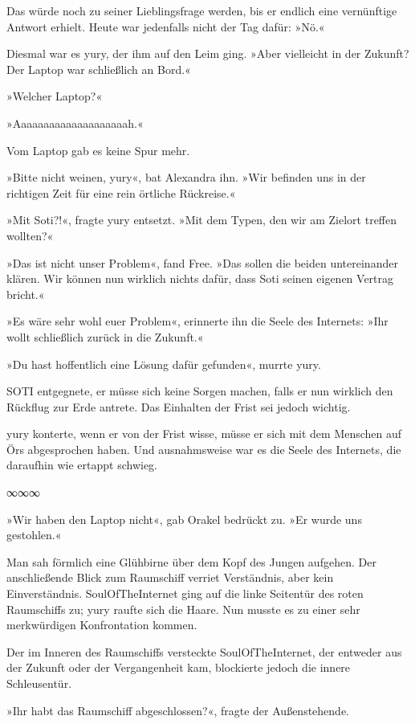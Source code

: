 Das würde noch zu seiner Lieblingsfrage werden, bis er endlich eine vernünftige Antwort erhielt. Heute war jedenfalls nicht der Tag dafür: »Nö.«

Diesmal war es yury, der ihm auf den Leim ging. »Aber vielleicht in der Zukunft? Der Laptop war schließlich an Bord.«

»Welcher Laptop?«

»Aaaaaaaaaaaaaaaaaaaah.«

Vom Laptop gab es keine Spur mehr.

»Bitte nicht weinen, yury«, bat Alexandra ihn. »Wir befinden uns in der richtigen Zeit für eine rein örtliche Rückreise.«

»Mit Soti?!«, fragte yury entsetzt. »Mit dem Typen, den wir am Zielort treffen wollten?«

»Das ist nicht unser Problem«, fand Free. »Das sollen die beiden untereinander klären. Wir können nun wirklich nichts dafür, dass Soti seinen eigenen Vertrag bricht.«

»Es wäre sehr wohl euer Problem«, erinnerte ihn die Seele des Internets: »Ihr wollt schließlich zurück in die Zukunft.«

»Du hast hoffentlich eine Lösung dafür gefunden«, murrte yury.

SOTI entgegnete, er müsse sich keine Sorgen machen, falls er nun wirklich den Rückflug zur Erde antrete. Das Einhalten der Frist sei jedoch wichtig.

yury konterte, wenn er von der Frist wisse, müsse er sich mit dem Menschen auf Örs abgesprochen haben. Und ausnahmsweise war es die Seele des Internets, die daraufhin wie ertappt schwieg.

\begin{center}
∞∞∞
\end{center}

»Wir haben den Laptop nicht«, gab Orakel bedrückt zu. »Er wurde uns gestohlen.«

Man sah förmlich eine Glühbirne über dem Kopf des Jungen aufgehen. Der anschließende Blick zum Raumschiff verriet Verständnis, aber kein Einverständnis. SoulOfTheInternet ging auf die linke Seitentür des roten Raumschiffs zu; yury raufte sich die Haare. Nun musste es zu einer sehr merkwürdigen Konfrontation kommen.

Der im Inneren des Raumschiffs versteckte SoulOfTheInternet, der entweder aus der Zukunft oder der Vergangenheit kam, blockierte jedoch die innere Schleusentür.

»Ihr habt das Raumschiff abgeschlossen?«, fragte der Außenstehende.

